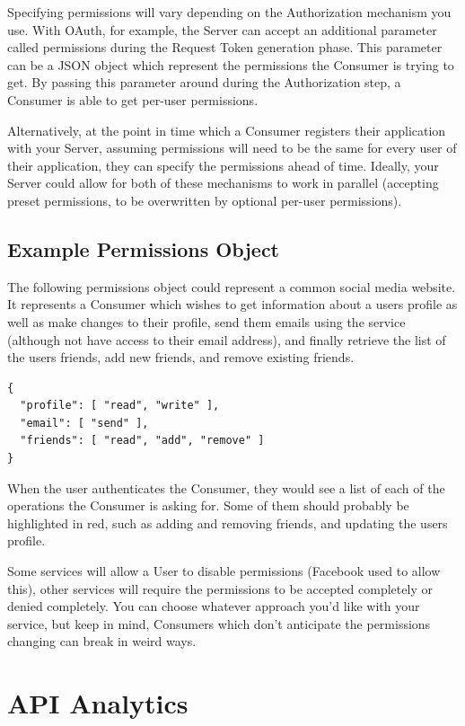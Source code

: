\documentclass{book}
\begin{document}
Specifying permissions will vary depending on the Authorization mechanism you use. With OAuth, for example, the Server can accept an additional parameter called permissions during the Request Token generation phase. This parameter can be a JSON object which represent the permissions the Consumer is trying to get. By passing this parameter around during the Authorization step, a Consumer is able to get per-user permissions.

Alternatively, at the point in time which a Consumer registers their application with your Server, assuming permissions will need to be the same for every user of their application, they can specify the permissions ahead of time. Ideally, your Server could allow for both of these mechanisms to work in parallel (accepting preset permissions, to be overwritten by optional per-user permissions).

\subsection{Example Permissions Object}

The following permissions object could represent a common social media website. It represents a Consumer which wishes to get information about a users profile as well as make changes to their profile, send them emails using the service (although not have access to their email address), and finally retrieve the list of the users friends, add new friends, and remove existing friends.

\begin{verbatim}
{
  "profile": [ "read", "write" ],
  "email": [ "send" ],
  "friends": [ "read", "add", "remove" ]
}
\end{verbatim}

When the user authenticates the Consumer, they would see a list of each of the operations the Consumer is asking for. Some of them should probably be highlighted in red, such as adding and removing friends, and updating the users profile.

Some services will allow a User to disable permissions (Facebook used to allow this), other services will require the permissions to be accepted completely or denied completely. You can choose whatever approach you'd like with your service, but keep in mind, Consumers which don't anticipate the permissions changing can break in weird ways.


\section{API Analytics}
\end{document}
